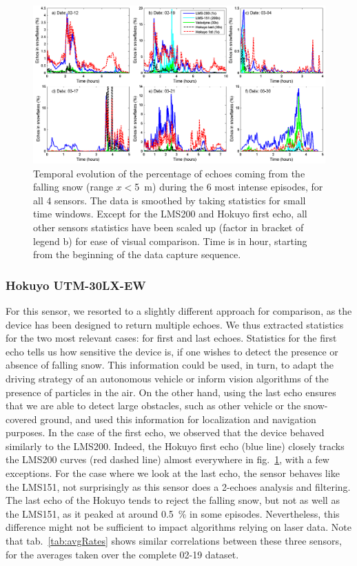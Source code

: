 \begin{figure}[th]
    \centering
    \includegraphics[width=0.98\linewidth]{./img/TimingSnow.png}
    \caption{Temporal evolution of the percentage of echoes coming from the falling snow (range $x<$\SI{5}{\meter}) during the 6 most intense episodes, for all 4 sensors. The data is smoothed by taking statistics for small time windows. Except for the LMS200 and Hokuyo first echo, all other sensors statistics have been scaled up (factor in bracket of legend b) for ease of visual comparison. Time is in hour, starting from the beginning of the data capture sequence. }
    \label{fig:TimingSnow}
\end{figure}


\subsubsection{Hokuyo UTM-30LX-EW}
For this sensor, we resorted to a slightly different approach for comparison, as the device has been designed to return multiple echoes. We thus extracted statistics for the two most relevant cases: for first and last echoes. Statistics for the first echo tells us how sensitive the device is, if one wishes to detect the presence or absence of falling snow. This information could be used, in turn, to adapt the driving strategy of an autonomous vehicle or inform vision algorithms of the presence of particles in the air. On the other hand, using the last echo ensures that we are able to detect large obstacles, such as other vehicle or the snow-covered ground, and used this information for localization and navigation purposes. In the case of the first echo, we observed that the device behaved similarly to the LMS200. Indeed, the Hokuyo first echo (blue line) closely tracks the LMS200 curves (red dashed line) almost everywhere in fig.~\ref{fig:TimingSnow}, with a few exceptions.  For the case where we look at the last echo, the sensor behaves like the LMS151, not surprisingly as this sensor does a 2-echoes analysis and filtering. The last echo of the Hokuyo tends to reject the falling snow, but not as well as the LMS151, as it peaked at around 0.5~\% in some episodes. Nevertheless, this difference might not be sufficient to impact algorithms relying on laser data. Note that tab.~\ref{tab:avgRates} shows similar correlations between these three sensors, for the averages taken over the complete 02-19 dataset. 

